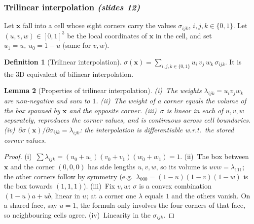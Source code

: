 \documentclass[11pt,a4paper]{article}
\newcommand{\sref}[1]{\texorpdfstring{\emph{(slides #1)}}{(slides #1)}}
\newcommand{\xx}{\boldsymbol{x}}
\theoremstyle{definition}
\newtheorem{definition}{Definition}[section]
\theoremstyle{plain}
\newtheorem{lemma}[definition]{Lemma}
\theoremstyle{remark}
\begin{document}
\subsubsection*{Trilinear interpolation \sref{12}}

Let $\xx$ fall into a cell whose eight corners carry the values $\sigma_{ijk}$, $i,j,k\in\{0,1\}$. Let $(u,v,w)\in[0,1]^3$ be the local coordinates of $\xx$ in the cell, and set $u_1=u,\ u_0=1-u$ (same for $v,w$).

\begin{definition}[Trilinear interpolation]
$\displaystyle \sigma(\xx)=\sum_{i,j,k\in\{0,1\}}u_i\,v_j\,w_k\,\sigma_{ijk}.$
It is the 3D equivalent of bilinear interpolation.
\end{definition}

\begin{lemma}[Properties of trilinear interpolation]\label{lem:trilin}
(i)~The weights $\lambda_{ijk}=u_iv_jw_k$ are non-negative and sum to $1$.
(ii)~The weight of a corner equals the volume of the box spanned by $\xx$ and the \emph{opposite} corner.
(iii)~$\sigma$ is linear in each of $u,v,w$ separately, reproduces the corner values, and is continuous across cell boundaries.
(iv)~$\partial\sigma(\xx)/\partial\sigma_{ijk}=\lambda_{ijk}$: the interpolation is differentiable w.r.t.\ the stored corner values.
\end{lemma}
\begin{proof}
(i)~$\sum\lambda_{ijk}=(u_0+u_1)(v_0+v_1)(w_0+w_1)=1$. (ii)~The box between $\xx$ and the corner $(0,0,0)$ has side lengths $u,v,w$, so its volume is $uvw=\lambda_{111}$; the other corners follow by symmetry (e.g.\ $\lambda_{000}=(1-u)(1-v)(1-w)$ is the box towards $(1,1,1)$). (iii)~Fix $v,w$: $\sigma$ is a convex combination $(1-u)a+ub$, linear in $u$; at a corner one $\lambda$ equals $1$ and the others vanish. On a shared face, say $u=1$, the formula only involves the four corners of that face, so neighbouring cells agree. (iv)~Linearity in the $\sigma_{ijk}$.
\end{proof}
\end{document}

